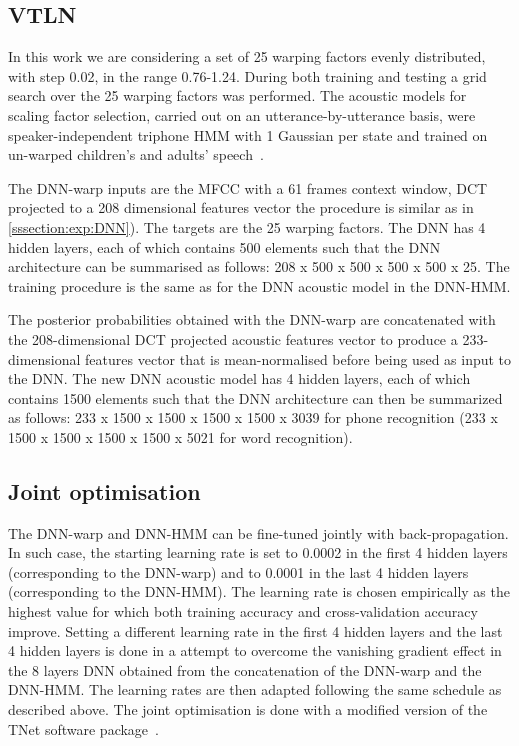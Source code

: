 \documentclass{nle}
\begin{document}
\subsection{VTLN}\label{sssection:exp:VTLN}
In  this  work  we are considering  a  set   of  25  warping   factors  evenly
distributed, with step 0.02, in the range 0.76-1.24. During both training and testing
a grid search over the 25 warping factors was performed.  The acoustic
models   for   scaling   factor    selection,   carried   out   on   an
utterance-by-utterance  basis, were speaker-independent  triphone HMM
with  1 Gaussian  per state  and  trained on  un-warped children's  and
adults' speech~\citep{WelKanNey99,GerGiuBru07}.

The DNN-warp inputs are the MFCC with a 61 frames context window, DCT
projected to a 208 dimensional features vector the procedure is similar as in \ref{sssection:exp:DNN}). The targets are the 25
warping factors. The  DNN has 4 hidden layers,  each of which contains
500  elements such  that the  DNN  architecture can  be summarised  as
follows: 208 x 500  x 500 x 500 x 500 x  25. The training procedure is
the same as for the DNN  acoustic model in the DNN-HMM.  

The posterior
probabilities  obtained with  the  DNN-warp are concatenated with  the
208-dimensional DCT  projected acoustic  features vector to produce a
233-dimensional features  vector that is mean-normalised  before being used
as input to  the DNN. The new DNN acoustic model  has 4 hidden layers,
each of  which contains 1500  elements such that the  DNN architecture
can then be summarized  as follows: 233 x 1500 x 1500  x 1500 x 1500 x
3039 for phone recognition (233 x 1500 x 1500  x 1500 x 1500 x 5021 for word recognition).

\subsection{Joint optimisation}\label{sssection:exp:joint}
The DNN-warp and DNN-HMM can be fine-tuned jointly with back-propagation. In such case, the starting learning rate is set to 0.0002 in the first 4 hidden layers (corresponding to the DNN-warp) and to 0.0001 in the last 4 hidden layers (corresponding to the DNN-HMM). The learning rate is chosen empirically as the highest value for which both training accuracy and cross-validation accuracy improve. Setting a different learning rate in the first 4 hidden layers and the last 4 hidden layers is done in a attempt to overcome the vanishing gradient effect in the 8 layers DNN obtained from the concatenation of the DNN-warp and the DNN-HMM. The learning rates are then adapted following the same schedule as described above. The joint optimisation is done with a modified version of the TNet software package~\citep{vesely10}.
\end{document}
